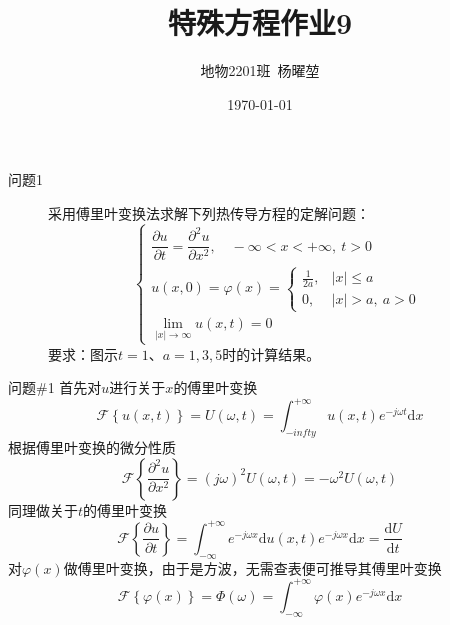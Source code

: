 \documentclass[12pt]{ctexart}
\title{特殊方程作业9}
\author{地物2201班\ 杨曜堃}
\date{\today}
\begin{document}
    \markboth{\theauthor}{\thetitle}
    \maketitle
    \begin{description}
        \item[问题1] 采用傅里叶变换法求解下列热传导方程的定解问题：$$
        \begin{cases}
            \dfrac{\partial u}{\partial t}=\dfrac{\partial^2u}{\partial x^2},\quad -\infty<x<+\infty,\ t>0\\
            u(x,0)=\varphi(x)=\begin{cases}
                \frac{1}{2a},& |x|\leqslant a\\
                0,& |x|>a,\ a>0
            \end{cases}\\
            \lim_{|x|\to\infty}u(x,t)=0
        \end{cases}
        $$
        要求：图示$t=1$、$a=1,3,5$时的计算结果。
    \end{description}
    \begin{problem}{问题\#1}
        首先对$u$进行关于$x$的傅里叶变换$$
        \mathscr{F}\left\{u(x,t)\right\}=U(\omega,t)=\int^{+\infty}_{-infty}u(x,t)e^{-j\omega t}\text{d}x$$
        根据傅里叶变换的微分性质$$
        \mathscr{F}\left\{\dfrac{\partial^2 u}{\partial x^2}\right\}=(j\omega)^2U(\omega,t)=-\omega^2U(\omega,t)
        $$
        同理做关于$t$的傅里叶变换$$
        \mathscr{F}\left\{\dfrac{\partial u}{\partial t}\right\}=\int^{+\infty}_{-\infty}e^{-j\omega x}\text{d}u(x,t)e^{-j\omega x}\text{d}x=\dfrac{\text{d}U}{\text{d}t}
        $$
        对$\varphi(x)$做傅里叶变换，由于是方波，无需查表便可推导其傅里叶变换
        $$
        \mathscr{F}\left\{\varphi(x)\right\}=\varPhi(\omega)=\int^{+\infty}_{-\infty}\varphi(x)e^{-j\omega x}\text{d}x
        $$
    \end{problem}
\end{document}
